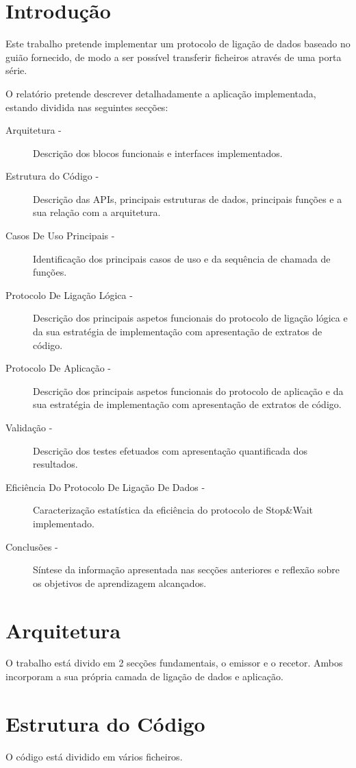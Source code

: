 \documentclass[11pt]{article}
\begin{document}
\section{Introdução}
Este trabalho pretende implementar um protocolo de ligação de dados baseado no guião fornecido, de modo a ser possível transferir ficheiros através de uma porta série.

O relatório pretende descrever detalhadamente a aplicação implementada, estando dividida nas seguintes secções:
\begin{description}
	\item[Arquitetura -] Descrição dos blocos funcionais e interfaces implementados.
	\item[Estrutura do Código -] Descrição das APIs, principais estruturas de dados, principais funções e a sua relação com a arquitetura.
	\item[Casos De Uso Principais -] Identificação dos principais casos de uso e da sequência de chamada de funções.
	\item[Protocolo De Ligação Lógica - ] Descrição dos principais aspetos funcionais do protocolo de ligação lógica e da sua estratégia de implementação com apresentação de extratos de código.
	\item[Protocolo De Aplicação - ] Descrição dos principais aspetos funcionais do protocolo de aplicação e da sua estratégia de implementação com apresentação de extratos de código.
	\item[Validação - ] Descrição dos testes efetuados com apresentação quantificada dos resultados.
	\item[Eficiência Do Protocolo De Ligação De Dados - ] Caracterização estatística da eficiência do protocolo de Stop\&Wait implementado.
	\item[Conclusões - ] Síntese da informação apresentada nas secções anteriores e reflexão sobre os objetivos de aprendizagem alcançados.
\end{description}

\section{Arquitetura}
O trabalho está divido em 2 secções fundamentais, o emissor e o recetor. Ambos incorporam a sua própria camada de ligação de dados e aplicação.

\section{Estrutura do Código}
O código está dividido em vários ficheiros.
\end{document}

